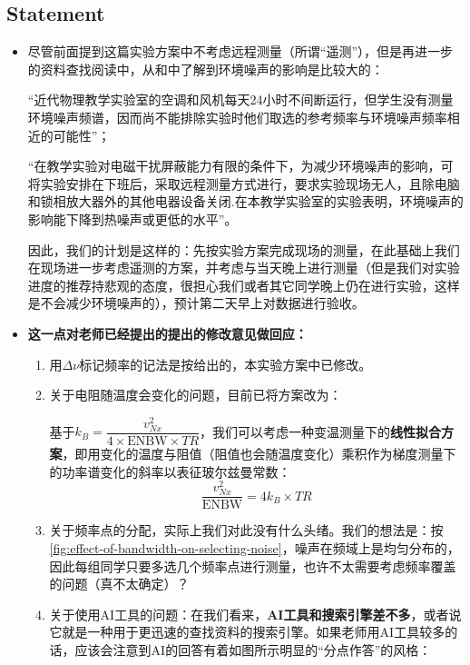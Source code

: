 \subsection{Statement}
\begin{itemize}
	\item 尽管前面提到这篇实验方案中不考虑远程测量（所谓“遥测”），但是再进一步的资料查找阅读中，从\cite{c}和\cite{g}中了解到环境噪声的影响是比较大的：
	
	“近代物理教学实验室的空调和风机每天24小时不间断运行，但学生没有测量环境噪声频谱，因而尚不能排除实验时他们取选的参考频率与环境噪声频率相近的可能性”；
	
	“在教学实验对电磁干扰屏蔽能力有限的条件下，为减少环境噪声的影响，可将实验安排在下班后，采取远程测量方式进行，要求实验现场无人，且除电脑和锁相放大器外的其他电器设备关闭.在本教学实验室的实验表明，环境噪声的影响能下降到热噪声或更低的水平”。
	
	因此，我们的计划是这样的：先按实验方案完成现场的测量，在此基础上我们在现场进一步考虑遥测的方案，并考虑与当天晚上进行测量（但是我们对实验进度的推荐持悲观的态度，很担心我们或者其它同学晚上仍在进行实验，这样是不会减少环境噪声的），预计第二天早上对数据进行验收。
	
	\item \textbf{\textcolor{fred}{这一点对老师已经提出的提出的修改意见做回应：}}
	\begin{enumerate}
		\item 用$\Delta\nu$标记频率的记法是按\cite{a}给出的，本实验方案中已修改。
		
		\item 关于电阻随温度会变化的问题，目前已将方案改为：
		
		基于$k_B = \dfrac{v_{Nx}^2}{4\times\text{ENBW}\times TR}$，我们可以考虑一种变温测量下的\textbf{线性拟合方案}，即用变化的温度与阻值（阻值也会随温度变化）乘积作为梯度测量下的功率谱变化的斜率以表征玻尔兹曼常数：
		$$
		\dfrac{v_{Nx}^2}{\text{ENBW}}=4k_B\times TR
		$$
		
		\item 关于频率点的分配，实际上我们对此没有什么头绪。我们的想法是：按\cref{fig:effect-of-bandwidth-on-selecting-noise}，噪声在频域上是均匀分布的，因此每组同学只要多选几个频率点进行测量，也许不太需要考虑频率覆盖的问题（真不太确定）？
		
		\item 关于使用AI工具的问题：在我们看来，\textbf{AI工具和搜索引擎差不多}，或者说它就是一种用于更迅速的查找资料的搜索引擎。如果老师用AI工具较多的话，应该会注意到AI的回答有着如图所示明显的“分点作答”的风格：
		

\end{enumerate}
\end{itemize}
